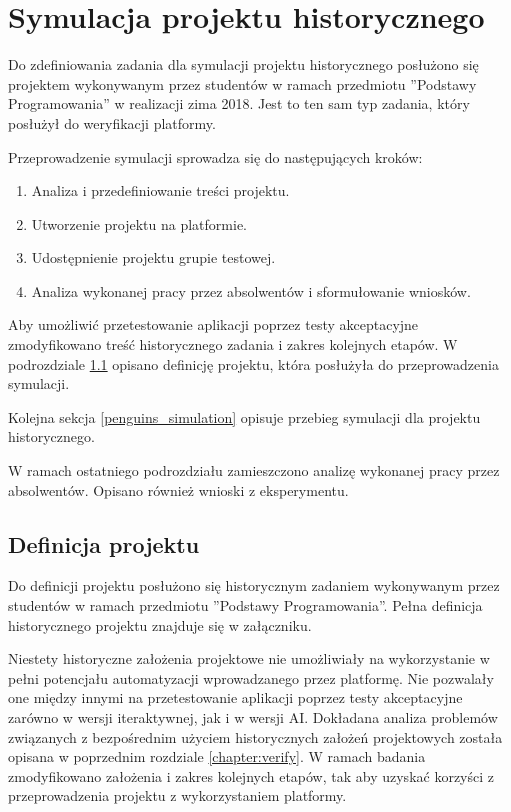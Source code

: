 \section{Symulacja projektu historycznego}
\label{research_penguins}

Do zdefiniowania zadania dla symulacji projektu historycznego posłużono się projektem wykonywanym przez studentów w ramach przedmiotu ”Podstawy Programowania” w realizacji zima 2018.
Jest to ten sam typ zadania, który posłużył do weryfikacji platformy.

Przeprowadzenie symulacji sprowadza się do następujących kroków:
\begin{enumerate}
    \item Analiza i przedefiniowanie treści projektu.
    \item Utworzenie projektu na platformie.
    \item Udostępnienie projektu grupie testowej.
    \item Analiza wykonanej pracy przez absolwentów i sformułowanie wniosków.
\end{enumerate}

Aby umożliwić przetestowanie aplikacji poprzez testy akceptacyjne zmodyfikowano treść historycznego zadania i zakres kolejnych etapów.
W podrozdziale \ref{penguins_project_definition} opisano definicję projektu, która posłużyła do przeprowadzenia symulacji.

Kolejna sekcja \ref{penguins_simulation} opisuje przebieg symulacji dla projektu historycznego.

W ramach ostatniego podrozdziału zamieszczono analizę wykonanej pracy przez absolwentów.
Opisano również wnioski z eksperymentu.


\subsection{Definicja projektu}
\label{penguins_project_definition}

Do definicji projektu posłużono się historycznym zadaniem wykonywanym przez studentów w ramach przedmiotu ”Podstawy Programowania”.
Pełna definicja historycznego projektu znajduje się w załączniku.

Niestety historyczne założenia projektowe nie umożliwiały na wykorzystanie w pełni potencjału automatyzacji wprowadzanego przez platformę.
Nie pozwalały one między innymi na przetestowanie aplikacji poprzez testy akceptacyjne zarówno w wersji iteraktywnej, jak i w wersji AI.
Dokładana analiza problemów związanych z bezpośrednim użyciem historycznych założeń projektowych została opisana w poprzednim rozdziale \ref{chapter:verify}.
W ramach badania zmodyfikowano założenia i zakres kolejnych etapów, tak aby uzyskać korzyści z przeprowadzenia projektu z wykorzystaniem platformy.

